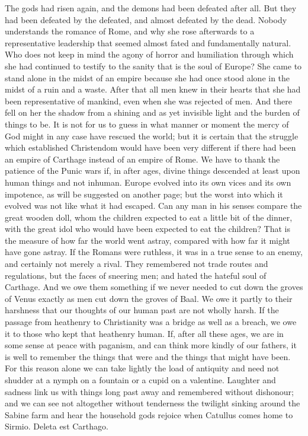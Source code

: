 The gods had risen again, and the demons had been defeated after all. But they had been defeated by the defeated, and almost defeated by the dead. Nobody understands the romance of Rome, and why she rose afterwards to a representative leadership that seemed almost fated and fundamentally natural. Who does not keep in mind the agony of horror and humiliation through which she had continued to testify to the sanity that is the soul of Europe? She came to stand alone in the midst of an empire because she had once stood alone in the midst of a ruin and a waste. After that all men knew in their hearts that she had been representative of mankind, even when she was rejected of men. And there fell on her the shadow from a shining and as yet invisible light and the burden of things to be. It is not for us to guess in what manner or moment the mercy of God might in any case have rescued the world; but it is certain that the struggle which established Christendom would have been very different if there had been an empire of Carthage instead of an empire of Rome. We have to thank the patience of the Punic wars if, in after ages, divine things descended at least upon human things and not inhuman. Europe evolved into its own vices and its own impotence, as will be suggested on another page; but the worst into which it evolved was not like what it had escaped. Can any man in his senses compare the great wooden doll, whom the children expected to eat a little bit of the dinner, with the great idol who would have been expected to eat the children? That is the measure of how far the world went astray, compared with how far it might have gone astray. If the Romans were ruthless, it was in a true sense to an enemy, and certainly not merely a rival. They remembered not trade routes and regulations, but the faces of sneering men; and hated the hateful soul of Carthage. And we owe them something if we never needed to cut down the groves of Venus exactly as men cut down the groves of Baal. We owe it partly to their harshness that our thoughts of our human past are not wholly harsh. If the passage from heathenry to Christianity was a bridge as well as a breach, we owe it to those who kept that heathenry human. If, after all these ages, we are in some sense at peace with paganism, and can think more kindly of our fathers, it is well to remember the things that were and the things that might have been. For this reason alone we can take lightly the load of antiquity and need not shudder at a nymph on a fountain or a cupid on a valentine. Laughter and sadness link us with things long past away and remembered without dishonour; and we can see not altogether without tenderness the twilight sinking around the Sabine farm and hear the household gods rejoice when Catullus comes home to Sirmio. Deleta est Carthago.

